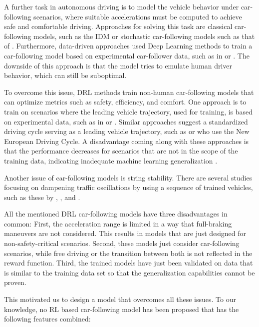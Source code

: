 \documentclass[review]{elsarticle}
\providecommand{\martinc}[1]{}                  %
\providecommand{\3}{{\ss}}
\begin{document}
	A further task in autonomous driving is to model the vehicle behavior
	under car-following scenarios, where suitable accelerations must be
	computed to achieve safe and comfortable driving. Approaches
	for solving this task are classical car-following models, such as the
	IDM \citep{Opus} or stochastic car-following
	models such as that of \cite{Treiber2018stochIDM_TRB}. Furthermore, data-driven approaches used Deep Learning methods to train a car-following model based on experimental car-follower data, such as in \cite{Chong2011SimulationOD} or \cite{ZHOU2017245}. The downside of this approach is that the model tries to emulate human driver behavior, which can still be suboptimal.
	
	To overcome this issue, DRL methods train non-human car-following models that can optimize metrics such as safety, efficiency, and comfort. 
	One approach is to train on scenarios where the leading vehicle
	trajectory, used for training, is based on experimental data, such as
	in \cite{SafeEfficientAndComfortable} or
	\cite{HumanLikeAutonomouCF}. Similar approaches suggest a standardized
	driving cycle serving as a leading vehicle trajectory, such
	as \cite{ComparisonRLvsMPC} or \cite{CFelectricVehicle}
	who\martinc{relative clauses mit Menschen: ``who'' statt
		``which'' oder ``that''} use the New European Driving Cycle.
	A disadvantage coming along with these approaches is that the
	performance decreases for scenarios that are not in the scope of the training data, indicating inadequate machine learning generalization \citep{ComparisonRLvsMPC}. 
	
	Another issue of car-following models is string stability. There are
	several studies focusing on dampening traffic oscillations by using a
	sequence of trained vehicles, such as these by \cite{qu2020jointly}, \cite{DissipatingStopAndGoWaves}, and \cite{DampenStopAndGoTraffic}.
	
	All the mentioned DRL car-following models have three disadvantages in
	common: First, the acceleration range is limited in a way that
	full-braking maneuvers are not considered. This results in models that are just designed for non-safety-critical scenarios. Second, these models just consider car-following scenarios, while free driving or the transition between both is not reflected in the reward function. Third, the trained models have just been validated on data that is similar to the training data set so that the generalization capabilities cannot be proven. 
	
	This motivated us to design a model that overcomes all these issues.
	To our knowledge, no RL based car-following model has been proposed that has the following features combined:
	
\end{document}

